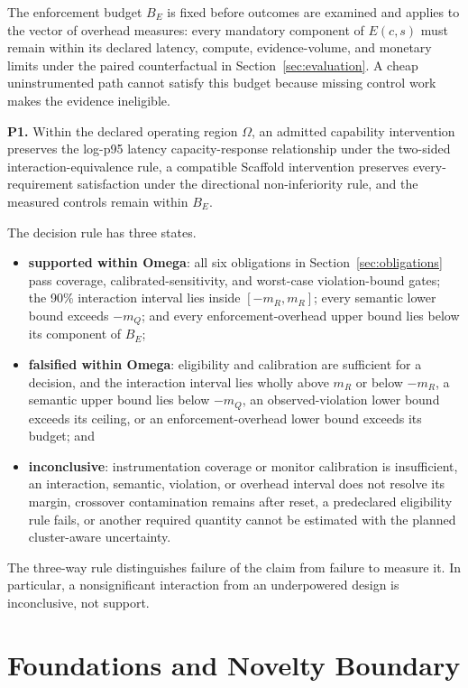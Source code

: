 The enforcement budget $B_E$ is fixed before outcomes are examined and applies to the vector of overhead measures: every mandatory component of $E(c,s)$ must remain within its declared latency, compute, evidence-volume, and monetary limits under the paired counterfactual in Section~\ref{sec:evaluation}. A cheap uninstrumented path cannot satisfy this budget because missing control work makes the evidence ineligible.

\textbf{P1.} Within the declared operating region $\Omega$, an admitted capability intervention preserves the log-p95 latency capacity-response relationship under the two-sided interaction-equivalence rule, a compatible Scaffold intervention preserves every-requirement satisfaction under the directional non-inferiority rule, and the measured controls remain within $B_E$.

The decision rule has three states.

\begin{itemize}
\item \textbf{supported within Omega}: all six obligations in Section~\ref{sec:obligations} pass coverage, calibrated-sensitivity, and worst-case violation-bound gates; the 90\% interaction interval lies inside $[-m_R,m_R]$; every semantic lower bound exceeds $-m_Q$; and every enforcement-overhead upper bound lies below its component of $B_E$;
\item \textbf{falsified within Omega}: eligibility and calibration are sufficient for a decision, and the interaction interval lies wholly above $m_R$ or below $-m_R$, a semantic upper bound lies below $-m_Q$, an observed-violation lower bound exceeds its ceiling, or an enforcement-overhead lower bound exceeds its budget; and
\item \textbf{inconclusive}: instrumentation coverage or monitor calibration is insufficient, an interaction, semantic, violation, or overhead interval does not resolve its margin, crossover contamination remains after reset, a predeclared eligibility rule fails, or another required quantity cannot be estimated with the planned cluster-aware uncertainty.
\end{itemize}

The three-way rule distinguishes failure of the claim from failure to measure it. In particular, a nonsignificant interaction from an underpowered design is inconclusive, not support.

\section{Foundations and Novelty Boundary}
\label{sec:related}

